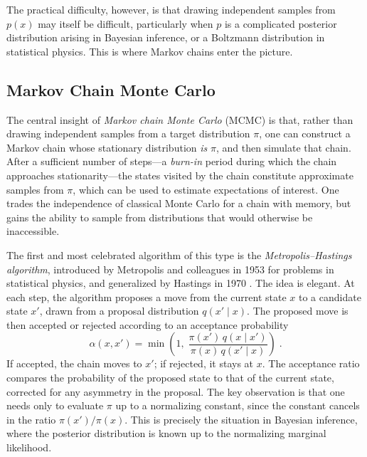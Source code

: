 \medskip

The practical difficulty, however, is that drawing independent samples from $p(x)$ may itself be difficult, particularly when $p$ is a complicated posterior distribution arising in Bayesian inference, or a Boltzmann distribution in statistical physics. This is where Markov chains enter the picture.

\subsection{Markov Chain Monte Carlo}

The central insight of \textit{Markov chain Monte Carlo} (MCMC) is that, rather than drawing independent samples from a target distribution $\pi$, one can construct a Markov chain whose stationary distribution \textit{is} $\pi$, and then simulate that chain. After a sufficient number of steps---a \textit{burn-in} period during which the chain approaches stationarity---the states visited by the chain constitute approximate samples from $\pi$, which can be used to estimate expectations of interest. One trades the independence of classical Monte Carlo for a chain with memory, but gains the ability to sample from distributions that would otherwise be inaccessible.

\medskip

The first and most celebrated algorithm of this type is the \textit{Metropolis--Hastings algorithm}, introduced by Metropolis and colleagues in 1953 \cite{metropolis_1953_equation} for problems in statistical physics, and generalized by Hastings in 1970 \cite{hastings_1970_monte}. The idea is elegant. At each step, the algorithm proposes a move from the current state $x$ to a candidate state $x'$, drawn from a proposal distribution $q(x' \mid x)$. The proposed move is then accepted or rejected according to an acceptance probability
\begin{equation}
    \alpha(x, x') = \min\!\left(1,\; \frac{\pi(x')\, q(x \mid x')}{\pi(x)\, q(x' \mid x)}\right) \; .
\end{equation}
If accepted, the chain moves to $x'$; if rejected, it stays at $x$. The acceptance ratio compares the probability of the proposed state to that of the current state, corrected for any asymmetry in the proposal. The key observation is that one needs only to evaluate $\pi$ up to a normalizing constant, since the constant cancels in the ratio $\pi(x')/\pi(x)$. This is precisely the situation in Bayesian inference, where the posterior distribution is known up to the normalizing marginal likelihood.

